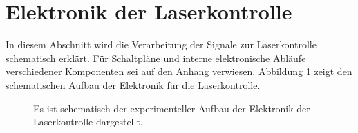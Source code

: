 \section{Elektronik der Laserkontrolle}\label{sec:elektronik_laserkontrolle} In
diesem Abschnitt wird die Verarbeitung der Signale zur Laserkontrolle schematisch erklärt. Für
Schaltpläne und interne elektronische Abläufe verschiedener Komponenten sei auf
den Anhang verwiesen. Abbildung \ref{fig:experimenteller_aufbau_elektronik_laserkontrolle} zeigt den
schematischen Aufbau der Elektronik für die Laserkontrolle.\par
\begin{figure}[h]
 	\centering
	\caption[Experimenteller Aufbau der Laserkontollelektronik,
	schematisch]{Es ist schematisch der experimenteller Aufbau der Elektronik der
	Laserkontrolle 
	dargestellt.}\label{fig:experimenteller_aufbau_elektronik_laserkontrolle}
\end{figure}

